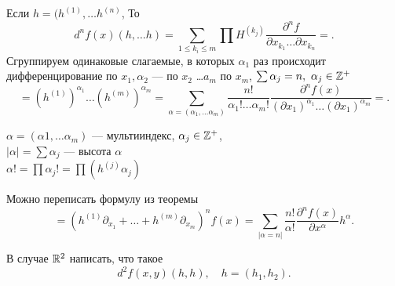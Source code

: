 \begin{thm}[еще более частный случай, $ X = \R^{m} , Y = \R, h_i = h_j$ ]
    Если $ h = (h^{(1)}, \ldots h^{(n)}$, То
    \[
	d^{n}f(x) (h, \ldots h) = \sum_{1 \le k_i \le m} \prod H^{(k_j)} \frac{\partial ^{n } f}{\partial x_{k_1} \ldots \partial x_{k_n}} = 
    .\] 
    Сгруппируем одинаковые слагаемые, в которых $ \alpha _1$ раз происходит дифференцирование по $ x_1, \alpha _2$ --- по $ x_2$  \ldots $ a_m$ по  $ x_m$, $ \sum \alpha _j = n, ~ \alpha _j \in \mathbb{Z}^{+} $ 
    \[
=(h^{(1)})^{\alpha _1} \ldots (h^{(m)})^{\alpha _m} 
=\sum_{\alpha = (\alpha _1, \ldots \alpha _m)} \frac{n!}{\alpha _1! \ldots \alpha _m!} \frac{\partial ^{n}f(x)}{(\partial x_1)^{\alpha _1} \ldots (\partial x_1)^{\alpha _m}}=
    .\] 
\end{thm}
\begin{name}
    $ $
    \\
    $ \alpha  = (\alpha 1, \ldots \alpha _m)$ ---  мультииндекс, $ \alpha _j \in  \mathbb{Z}^{+}$,\\
    $ \left| \alpha  \right| = \sum \alpha _j $ --- высота  $ \alpha $\\
    $ \alpha !  = \prod \alpha _j ! = \prod (h^{(j)}{\alpha _j})$

\end{name}
Можно переписать формулу из теоремы
\[
    = \left(h^{(1)} \partial _{x_1} + \ldots + h^{(m)} \partial _{x_m}\right)^{n } f(x) = \sum_{\lvert \alpha = n \rvert }^{} \frac{n! }{\alpha !} \frac{\partial ^{n} f(x)}{\partial x^{\alpha }} h^{\alpha }
.\] 
\begin{prac}
    В случае $ \mathbb{R}^2$ написать, что такое
    \[
	d^2f(x, y)(h, h) , \quad h = (h_1, h_2)
    .\] 
\end{prac}
